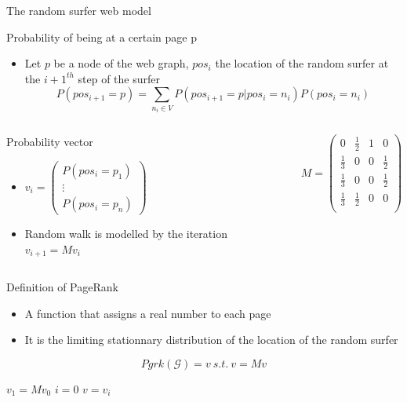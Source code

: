 \documentclass[10pt]{beamer}
\begin{document}
\begin{frame}{The random surfer web model}
\begin{block}{Probability of being at a certain page p}
\begin{itemize}
\item Let $p$ be a node of the web graph, $pos_i$ the location of the random surfer at the $i+1^{th}$ step of the surfer
$$ P(pos_{i+1}=p) = \sum_{n_i\in V} P(pos_{i+1}=p|pos_{i}=n_i)  P(pos_i = n_i)$$
\end{itemize}
\end{block}
\begin{columns}
\centering
\begin{column}{0.5\paperwidth}
\begin{block}{Probability vector}
\begin{itemize}
\item $ v_i = 
\begin{pmatrix}
P(pos_i = p_1) \\
\vdots \\
P(pos_i = p_n)
\end{pmatrix}
$
\item Random walk is modelled by the iteration $v_{i+1} = M v_i$
\end{itemize}

\end{block}
\end{column}
\begin{column}{0.4\paperwidth}
$$M = \begin{pmatrix}
0 & \frac{1}{2} & 1 & 0 \\
\frac{1}{3} & 0 & 0 & \frac{1}{2} \\
\frac{1}{3} & 0 & 0 & \frac{1}{2} \\
\frac{1}{3} & \frac{1}{2} & 0 & 0 \\
\end{pmatrix}$$
\end{column}
\end{columns}
\end{frame}

\begin{frame}{Definition of PageRank}
  \begin{definition}
    \begin{itemize}
      \item A function that assigns a real number to each page
	\item It is the limiting stationnary distribution of the location of the random surfer
    \end{itemize}
    $$Pgrk(\mathcal{G}) = v \:s.t.\: v=Mv $$
  \end{definition}
  \begin{algorithm}[H]
    $v_1 = Mv_0$\;
    $i=0$\;
    $v = v_{i}$\;
    \caption{PageRank}
  \end{algorithm}
\end{frame}
\end{document}
